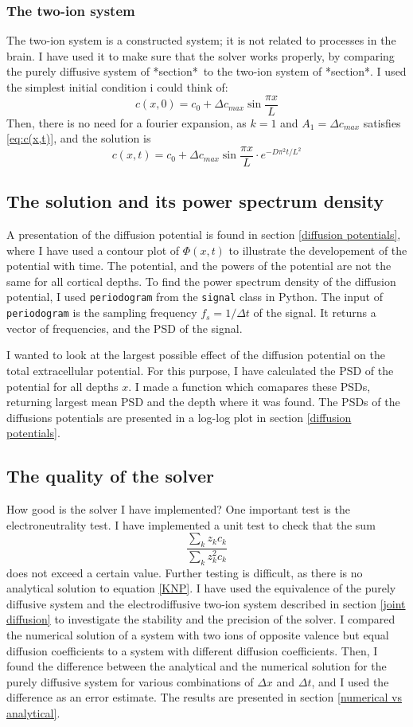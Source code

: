 \documentclass{article}
\begin{document}
\subsubsection{The two-ion system}
The two-ion system is a constructed system; it is not related to processes in the brain. I have used it to make sure that the solver works properly, by comparing the purely diffusive system of *section*\ to the two-ion system of *section*. I used the simplest initial condition i could think of: 
$$c(x,0) =c_0 +  \Delta c_{max}\sin{\frac{\pi x}{L}}$$
Then, there is no need for a fourier expansion, as $k=1$ and $A_1 = \Delta c_{max}$ satisfies \ref{eq:c(x,t)}, and the solution is
\begin{equation*}
c(x,t) =c_0 + \Delta c_{max} \sin \frac{ \pi x}{L}\cdot e^{-D\pi^2 t /L^2}
\end{equation*}


\subsection{The solution and its power spectrum density}
A presentation of the diffusion potential is found in section \ref{diffusion potentials}, where I have used a contour plot of $\Phi(x,t)$ to illustrate the developement of the potential with time. The potential, and the powers of the potential are not the same for all cortical depths.
To find the power spectrum density of the diffusion potential, I used \texttt{periodogram}  from the \texttt{signal} class in Python. The input of \texttt{periodogram} is the sampling frequency $f_s = 1/\Delta t$ of the signal. It returns a vector of frequencies, and the PSD of the signal.

 I wanted to look at the largest possible effect of the diffusion potential on the total extracellular potential. For this purpose, I have calculated the PSD of the potential for all depths $x$. I made a function which comapares these PSDs, returning largest mean PSD and the depth where it was found. The PSDs of the diffusions potentials are presented in a log-log plot in section \ref{diffusion potentials}.

\subsection{The quality of the solver}
How good is the solver I have implemented? One important test is the electroneutrality test. I have implemented a unit test to check that the sum 
$$\frac{\sum_k z_k c_k}{\sum_k z_k^2 c_k}$$
does not exceed a certain value. Further testing is difficult, as there is no analytical solution to equation \ref{KNP}. I have used the equivalence of the purely diffusive system and the electrodiffusive two-ion system described in section \ref{joint diffusion} to investigate the stability and the precision of the solver. I compared the numerical solution of a system with two ions of opposite valence but equal diffusion coefficients to a system with different diffusion coefficients. 
Then, I found the difference between the analytical and the numerical solution for the purely diffusive system for various combinations of $\Delta x$ and $\Delta t$, and I used the difference as an error estimate. The results are presented in section \ref{numerical vs analytical}. 
\end{document}
